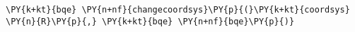 \begin{Verbatim}[commandchars=\\\{\}]
    \PY{k+kt}{bqe} \PY{n+nf}{changecoordsys}\PY{p}{(}\PY{k+kt}{coordsys} \PY{n}{R}\PY{p}{,} \PY{k+kt}{bqe} \PY{n+nf}{bqe}\PY{p}{)}
\end{Verbatim}
